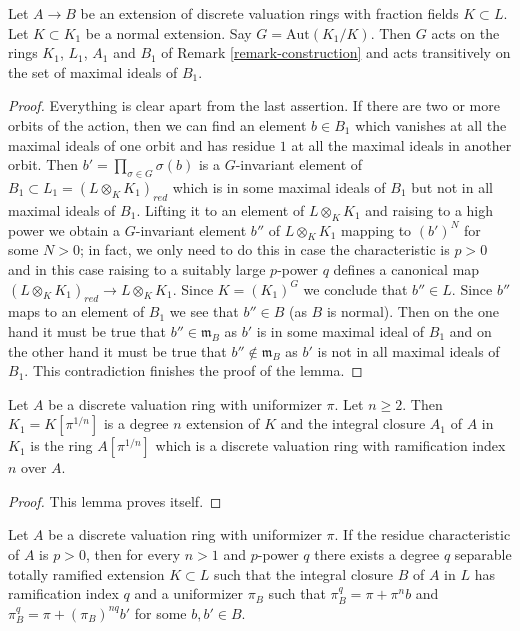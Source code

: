 \begin{lemma}
\label{lemma-galois-relative}
Let $A \to B$ be an extension of discrete valuation rings with fraction fields
$K \subset L$. Let $K \subset K_1$ be a normal extension. Say
$G = \text{Aut}(K_1/K)$. Then $G$ acts on the rings $K_1$, $L_1$,
$A_1$ and $B_1$ of Remark \ref{remark-construction}
and acts transitively on the set of maximal ideals of $B_1$.
\end{lemma}

\begin{proof}
Everything is clear apart from the last assertion. If there are two or
more orbits of the action, then we can find an element $b \in B_1$
which vanishes at all the maximal ideals of one orbit and has residue
$1$ at all the maximal ideals in another orbit. Then
$b' = \prod_{\sigma \in G} \sigma(b)$ is a $G$-invariant element of
$B_1 \subset L_1 = (L \otimes_K K_1)_{red}$ which is in some maximal
ideals of $B_1$
but not in all maximal ideals of $B_1$. Lifting it to an element of
$L \otimes_K K_1$ and raising to a high power we obtain a $G$-invariant
element $b''$ of $L \otimes_K K_1$ mapping to $(b')^N$ for some $N > 0$;
in fact, we only need to do this in case the characteristic is $p > 0$ and
in this case raising to a suitably large $p$-power $q$ defines a
canonical map $(L \otimes_K K_1)_{red} \to L \otimes_K K_1$.
Since $K = (K_1)^G$ we conclude that $b'' \in L$. Since $b''$ maps
to an element of $B_1$ we see that $b'' \in B$ (as $B$ is normal).
Then on the one hand it must be true that $b'' \in \mathfrak m_B$
as $b'$ is in some maximal ideal of $B_1$ and on the other hand it
must be true that $b'' \not \in \mathfrak m_B$ as $b'$ is not in
all maximal ideals of $B_1$. This contradiction finishes the proof of the
lemma.
\end{proof}

\begin{lemma}
\label{lemma-pull-root-uniformizer}
Let $A$ be a discrete valuation ring with uniformizer $\pi$.
Let $n \geq 2$. Then $K_1 = K[\pi^{1/n}]$ is a degree $n$ extension of $K$
and the integral closure $A_1$ of $A$ in $K_1$ is the ring $A[\pi^{1/n}]$
which is a discrete valuation ring with ramification index $n$ over $A$.
\end{lemma}

\begin{proof}
This lemma proves itself.
\end{proof}

\begin{lemma}
\label{lemma-make-degree-q-extension}
Let $A$ be a discrete valuation ring with uniformizer $\pi$. If the residue
characteristic of $A$ is $p > 0$, then for every $n > 1$ and $p$-power $q$
there exists a degree $q$ separable totally ramified extension $K \subset L$
such that the integral closure $B$ of $A$ in $L$ has ramification index
$q$ and a uniformizer $\pi_B$ such that
$\pi_B^q = \pi + \pi^n b$ and $\pi_B^q = \pi + (\pi_B)^{nq}b'$
for some $b, b' \in B$.
\end{lemma}

